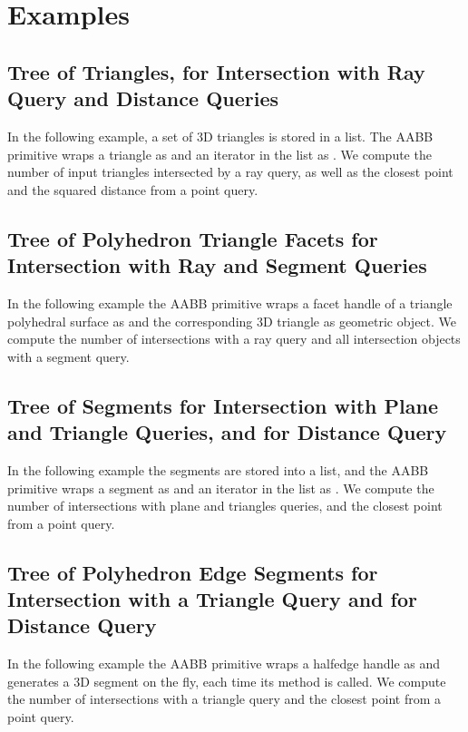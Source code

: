 \section{Examples}
\label{AABB_tree_section_examples}

\subsection{Tree of Triangles, for Intersection with Ray Query and Distance Queries}
In the following example, a set of 3D triangles is stored in a list. The AABB primitive wraps a triangle as  and an iterator in the list as . We compute the number of input triangles intersected by a ray query, as well as the closest point and the squared distance from a point query.

\subsection{Tree of Polyhedron Triangle Facets for Intersection with Ray and Segment Queries}
In the following example the AABB primitive wraps a facet handle of a triangle polyhedral surface as  and the corresponding 3D triangle as geometric object. We compute the number of intersections with a ray query and all intersection objects with a segment query. 

\subsection{Tree of Segments for Intersection with Plane and Triangle Queries, and for Distance Query}
In the following example the segments are stored into a list, and the AABB primitive wraps a segment as  and an iterator in the list as . We compute the number of intersections with plane and triangles queries, and the closest point from a point query. 

\subsection{Tree of Polyhedron Edge Segments for Intersection with a Triangle Query and for Distance Query}
In the following example the AABB primitive wraps a halfedge handle as  and generates a 3D segment on the fly, each time its method  is called. We compute the number of intersections with a triangle query and the closest point from a point query. 
